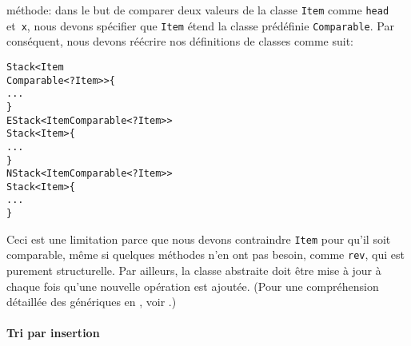 méthode: dans le but de comparer deux valeurs de la classe
\texttt{Item} comme \texttt{head} et~\texttt{x}, nous devons spécifier
que \texttt{Item} étend la classe prédéfinie \texttt{Comparable}. Par
conséquent, nous devons réécrire nos définitions de classes comme
suit:
\begin{alltt}
\public \abstractX \class Stack<Item
\hfill\extends Comparable<? \super Item>> \{
  ...
\}
\public \class EStack<Item \extends Comparable<? \super Item>>
       \extends Stack<Item> \{
  ...
\}
\public \class NStack<Item \extends Comparable<? \super Item>>
       \extends Stack<Item> \{
  ...
\}
\end{alltt}
Ceci est une limitation parce que nous devons contraindre
\texttt{Item} pour qu'il soit comparable, même si quelques méthodes
n'en ont pas besoin, comme \texttt{rev}, qui est purement
structurelle. Par ailleurs, la classe abstraite doit être mise à jour
à chaque fois qu'une nouvelle opération est ajoutée. (Pour une
compréhension détaillée des génériques en \Java, voir
\cite{NaftalinWadler_2006}.)  

\paragraph{Tri par insertion}

